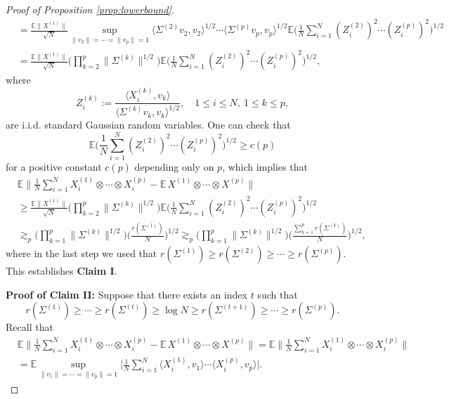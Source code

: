 \documentclass[10pt,a4paper]{amsart}
\newcommand{\E}{\mathbb{E}}
\begin{document}
\begin{proof}[Proof of Proposition \ref{prop:lowerbound}]
\begin{align*}
    &=\frac{\E \|X^{(1)}\|}{\sqrt{N}}  \sup_{\|v_2\|= \cdots =\|v_p\|=1} \langle \Sigma^{(2)} v_2,v_2 \rangle^{1/2}\cdots \langle \Sigma^{(p)} v_p,v_p \rangle^{1/2} \E \bigg(\frac{1}{N}\sum_{i=1}^{N} (Z_i^{(2)})^{2} \cdots (Z_i^{(p)})^{2} \bigg)^{1/2}\\
    &=\frac{\E \|X^{(1)}\|}{\sqrt{N}}\bigg(\prod_{k=2}^p\|\Sigma^{(k)}\|^{1 / 2}\bigg)\E \bigg(\frac{1}{N}\sum_{i=1}^{N} (Z_i^{(2)})^{2} \cdots (Z_i^{(p)})^{2} \bigg)^{1/2},
\end{align*}
where
\[
Z^{(k)}_i :=\frac{\langle X^{(k)}_i,v_k \rangle}{\langle \Sigma^{(k)} v_k ,v_k\rangle^{1/2}},\quad 1\le i\le N, \ 1\le k\le p,
\]
are i.i.d. standard Gaussian random variables. One can check that
\[
\E\bigg(\frac{1}{N}\sum_{i=1}^{N} (Z_i^{(2)})^{2} \cdots (Z_i^{(p)})^{2} \bigg)^{1/2}\ge c(p)
\]
for a positive constant $c(p)$ depending only on $p$, which implies that
\begin{align*}
    &\E \bigg\|\frac{1}{N} \sum_{i=1}^N X_i^{(1)} \otimes \cdots \otimes X_i^{(p)}-\E\, X^{(1)} \otimes \cdots \otimes X^{(p)}\bigg\|\\
    &\ge \frac{\E \|X^{(1)}\|}{\sqrt{N}}\bigg(\prod_{k=2}^p\|\Sigma^{(k)}\|^{1 / 2}\bigg)\E \bigg(\frac{1}{N}\sum_{i=1}^{N} (Z_i^{(2)})^{2} \cdots (Z_i^{(p)})^{2} \bigg)^{1/2}\\
    &\gtrsim_p \bigg(\prod_{k=1}^p\|\Sigma^{(k)}\|^{1 / 2}\bigg)\bigg(\frac{r(\Sigma^{(1)})}{N}\bigg)^{1/2}
    \gtrsim_p \bigg(\prod_{k=1}^p\|\Sigma^{(k)}\|^{1 / 2}\bigg)\bigg(\frac{\sum_{k=1}^p r(\Sigma^{(k)})}{N}\bigg)^{1/2},
\end{align*}
where in the last step we used that $r(\Sigma^{(1)})\ge r(\Sigma^{(2)})\ge \cdots\ge r(\Sigma^{(p)})$. This establishes \textbf{Claim I}.

\textbf{Proof of Claim II:}
Suppose that there exists an index $t$ such that 
\[
r(\Sigma^{(1)})\ge \cdots \ge r(\Sigma^{(t)})\ge \log N \ge r(\Sigma^{(t+1)})\ge \cdots \ge r(\Sigma^{(p)}).
\]
Recall that
\begin{align*}
&\E \bigg\|\frac{1}{N} \sum_{i=1}^N X_i^{(1)} \otimes \cdots \otimes X_i^{(p)}-\E\, X^{(1)} \otimes \cdots \otimes X^{(p)}\bigg\|=\E \bigg\|\frac{1}{N} \sum_{i=1}^N X_i^{(1)} \otimes \cdots \otimes X_i^{(p)}\bigg\| \\
&= \E \sup_{\|v_1\|= \cdots =\|v_p\|=1} \bigg| \frac{1}{N}\sum_{i=1}^N \langle X^{(1)}_i,v_1\rangle \cdots \langle X^{(p)}_i, v_p \rangle \bigg|.
\end{align*}
 


\end{proof}
\end{document}
